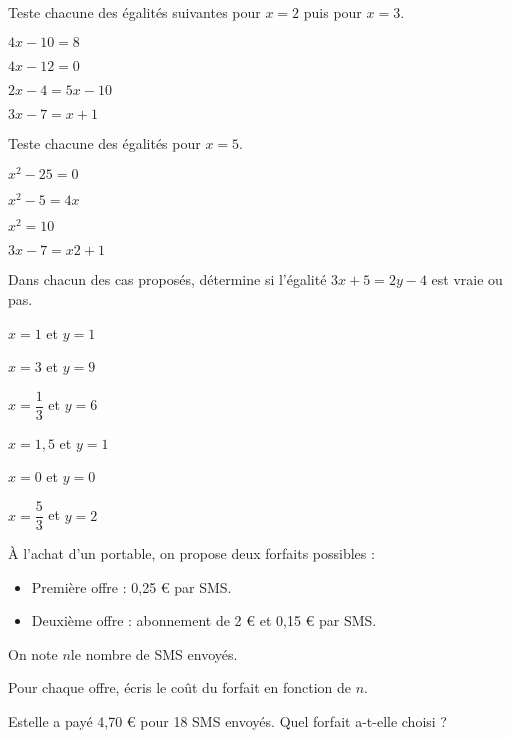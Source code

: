 \begin{exercice}
Teste chacune des égalités suivantes pour $x = 2$ puis pour $x = 3$.

\begin{colenumerate}{2} 
\item $4x - 10 = 8$
\item $4x - 12 = 0$
\item $2x - 4 = 5x - 10$
\item $3x - 7 = x + 1$
\end{colenumerate} 
\end{exercice}



\begin{exercice}
Teste chacune des égalités pour $x = 5$.

\begin{colenumerate}{2} 
\item $x^2 - 25 = 0$
\item $x^2 - 5 = 4x$
\item $x^2 = 10$
\item $3x - 7 = x2 + 1$
\end{colenumerate} 
\end{exercice}


\begin{exercice}
Dans chacun des cas proposés, détermine si l'égalité $3x + 5 = 2y - 4$ est vraie ou pas.

\begin{colenumerate}{2} 
\item $x = 1$ et $y = 1$
\item $x = 3$ et $y = 9$
\item $x = \dfrac{1}{3}$ et $y = 6$
\item $x = 1,5$ et $y = 1$
\item $x = 0$ et $y = 0$
\item $x = \dfrac{5}{3}$ et $y = 2$
\end{colenumerate} 
\end{exercice}

\begin{exercice}
À l'achat d'un portable, on propose deux forfaits possibles :
\begin{itemize}
\item Première offre : 0,25 € par SMS. 
\item Deuxième offre : abonnement de 2 € et 0,15 € par SMS.
\end{itemize}

On note $n $le nombre de SMS envoyés.

\begin{colenumerate}{1} 
\item Pour chaque offre, écris le coût du forfait en fonction de $n$. 
\item Estelle a payé 4,70 € pour 18 SMS envoyés. Quel forfait a-t-elle choisi ?
\end{colenumerate} 
\end{exercice}



